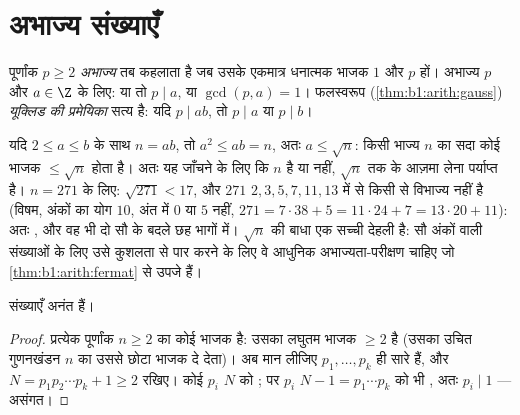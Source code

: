 \section{अभाज्य संख्याएँ}

\begin{definition}\label{def:b1:arith:prime}
पूर्णांक $p \geq 2$ \emph{अभाज्य} तब कहलाता है जब उसके
एकमात्र धनात्मक भाजक $1$ और $p$ हों। अभाज्य $p$ और $a \in \Z$ के लिए: या तो
$p \mid a$, या $\gcd(p, a) = 1$। फलस्वरूप (\cref{thm:b1:arith:gauss})
\emph{यूक्लिड की प्रमेयिका} सत्य है: यदि $p \mid ab$, तो $p \mid a$ या $p
\mid b$।
\end{definition}

\begin{remark}[भाग देकर अभाज्यता की जाँच]\label{rem:b1:arith:trialdivision}
यदि $2 \leq a \leq b$ के साथ $n = ab$, तो $a^2 \leq ab = n$, अतः $a \leq
\sqrt n$: किसी भाज्य $n$ का सदा कोई  भाजक $\leq \sqrt n$ होता है। अतः
यह जाँचने के लिए कि $n$  है या नहीं, $\sqrt n$ तक के  आज़मा लेना
पर्याप्त है। $n = 271$ के लिए: $\sqrt{271} < 17$, और $271$ $2, 3, 5, 7, 11,
13$ में से किसी से विभाज्य नहीं है (विषम, अंकों का योग $10$, अंत में $0$ या
$5$ नहीं, $271 = 7\cdot38 + 5 = 11\cdot24 + 7 = 13\cdot20 + 11$): अतः
, और वह भी दो सौ के बदले छह भागों में। $\sqrt n$ की बाधा एक सच्ची
देहली है: सौ अंकों वाली संख्याओं के लिए उसे कुशलता से पार करने के लिए वे
आधुनिक अभाज्यता-परीक्षण चाहिए जो \cref{thm:b1:arith:fermat} से उपजे हैं।
\end{remark}

\begin{theorem}[यूक्लिड]\label{thm:b1:arith:euclidprimes}
 संख्याएँ अनंत हैं।
\end{theorem}

\begin{proof}
प्रत्येक पूर्णांक $n \geq 2$ का कोई  भाजक है: उसका लघुतम भाजक $\geq 2$
 है (उसका उचित गुणनखंडन $n$ का उससे छोटा भाजक दे देता)। अब मान लीजिए
$p_1, \dots, p_k$ ही सारे  हैं, और $N = p_1 p_2 \cdots p_k + 1 \geq 2$
रखिए। कोई  $p_i$ $N$ को ; पर $p_i$ $N - 1 = p_1\cdots
p_k$ को भी , अतः $p_i \mid 1$ --- असंगत।
\end{proof}

